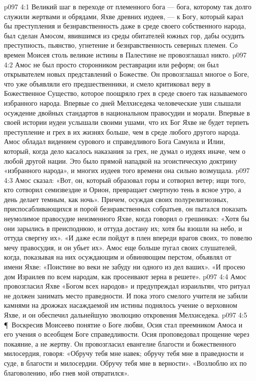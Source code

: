 \vs p097 4:1 Великий шаг в переходе от племенного бога --- бога, которому так долго служили жертвами и обрядами, Яхве древних иудеев, --- к Богу, который карал бы преступления и безнравственность даже в среде своего собственного народа, был сделан Амосом, явившимся из среды обитателей южных гор, дабы осудить преступность, пьянство, угнетение и безнравственность северных племен. Со времен Моисея столь великие истины в Палестине не провозглашал никто.
\vs p097 4:2 Амос не был просто сторонником реставрации или реформ; он был открывателем новых представлений о Божестве. Он провозглашал многое о Боге, что уже объявляли его предшественники, и смело критиковал веру в Божественное Существо, которое поощряло грех в среде своего так называемого избранного народа. Впервые со дней Мелхиседека человеческие уши слышали осуждение двойных стандартов в национальном правосудии и морали. Впервые в своей истории иудеи услышали своими ушами, что их Бог Яхве не будет терпеть преступление и грех в их жизнях больше, чем в среде любого другого народа. Амос обладал видением сурового и справедливого Бога Самуила и Илии, который, когда дело касалось наказания за грех, не думал о иудеях иначе, чем о любой другой нации. Это было прямой нападкой на эгоистическую доктрину «избранного народа», и многих иудеев того времени она сильно возмущала.
\vs p097 4:3 Амос сказал: «Вот, он, который образовал горы и сотворил ветер; ищи того, кто сотворил семизвездие и Орион, превращает смертную тень в ясное утро, а день делает темным, как ночь». Причем, осуждая своих полурелигиозных, приспосабливающихся и порой безнравственных собратьев, он пытался показать неумолимое правосудие неизменного Яхве, когда говорил о грешниках: «Хотя бы они зарылись в преисподнюю, и оттуда достану их; хотя бы взошли на небо, и оттуда свергну их». «И даже если пойдут в плен впереди врагов своих, то повелю мечу правосудия, и он убьет их». Амос еще больше пугал своих слушателей, когда, показывая на них осуждающим и обвиняющим перстом, объявлял от имени Яхве: «Поистине во веки не забуду ни одного из дел ваших». «И просею дом Израилев по всем народам, как просеивают зерна в решете».
\vs p097 4:4 Амос провозгласил Яхве «Богом всех народов» и предупреждал израильтян, что ритуал не должен занимать место праведности. И пока этого смелого учителя не забили камнями на дрожжах насаждаемой им истины поднялось учение о верховном Яхве, и он обеспечил дальнейшую эволюцию откровения Мелхиседека.
\vs p097 4:5 \P\ Воскресив Моисеево понятие о Боге любви, Осия стал преемником Амоса и его учения о всеобщем Боге справедливости. Осия проповедовал прощение через покаяние, а не жертву. Он провозгласил евангелие благости и божественного милосердия, говоря: «Обручу тебя мне навек; обручу тебя мне в праведности и суде, в благости и милосердии. Обручу тебя мне в верности». «Возлюблю их по благоволению, ибо гнев мой отвратился».
